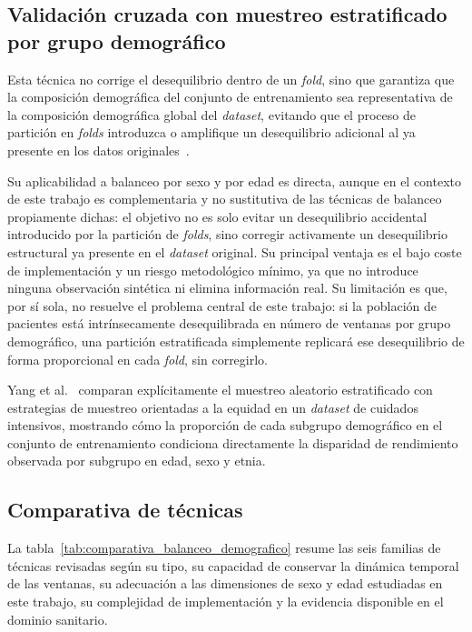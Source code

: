 \subsection{Validación cruzada con muestreo estratificado por grupo demográfico}
\label{subsec:stratified_cv_demografico}

Esta técnica no corrige el desequilibrio dentro de un \emph{fold}, sino que garantiza que la composición demográfica del conjunto de entrenamiento sea representativa de la composición demográfica global del \emph{dataset}, evitando que el proceso de partición en \emph{folds} introduzca o amplifique un desequilibrio adicional al ya presente en los datos originales~\cite{yang2024datasetrepresentativeness}.

Su aplicabilidad a balanceo por sexo y por edad es directa, aunque en el contexto de este trabajo es complementaria y no sustitutiva de las técnicas de balanceo propiamente dichas: el objetivo no es solo evitar un desequilibrio accidental introducido por la partición de \emph{folds}, sino corregir activamente un desequilibrio estructural ya presente en el \emph{dataset} original. Su principal ventaja es el bajo coste de implementación y un riesgo metodológico mínimo, ya que no introduce ninguna observación sintética ni elimina información real. Su limitación es que, por sí sola, no resuelve el problema central de este trabajo: si la población de pacientes está intrínsecamente desequilibrada en número de ventanas por grupo demográfico, una partición estratificada simplemente replicará ese desequilibrio de forma proporcional en cada \emph{fold}, sin corregirlo.

Yang et al.~\cite{yang2024datasetrepresentativeness} comparan explícitamente el muestreo aleatorio estratificado con estrategias de muestreo orientadas a la equidad en un \emph{dataset} de cuidados intensivos, mostrando cómo la proporción de cada subgrupo demográfico en el conjunto de entrenamiento condiciona directamente la disparidad de rendimiento observada por subgrupo en edad, sexo y etnia.

\subsection{Comparativa de técnicas}
\label{subsec:comparativa_balanceo_demografico}

La tabla~\ref{tab:comparativa_balanceo_demografico} resume las seis familias de técnicas revisadas según su tipo, su capacidad de conservar la dinámica temporal de las ventanas, su adecuación a las dimensiones de sexo y edad estudiadas en este trabajo, su complejidad de implementación y la evidencia disponible en el dominio sanitario.

